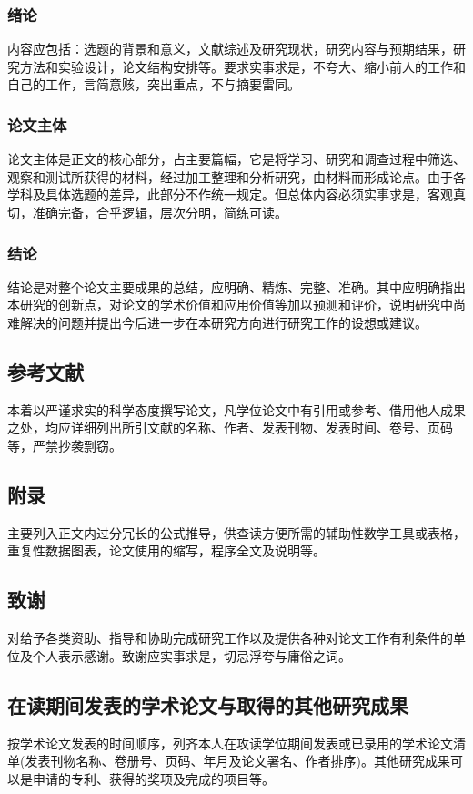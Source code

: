 \subsubsection{绪论}
内容应包括：选题的背景和意义，文献综述及研究现状，研究内容与预期结果，研究方法和实验设计，论文结构安排等。要求实事求是，不夸大、缩小前人的工作和自己的工作，言简意赅，突出重点，不与摘要雷同。
\subsubsection{论文主体}
论文主体是正文的核心部分，占主要篇幅，它是将学习、研究和调查过程中筛选、观察和测试所获得的材料，经过加工整理和分析研究，由材料而形成论点。由于各学科及具体选题的差异，此部分不作统一规定。但总体内容必须实事求是，客观真切，准确完备，合乎逻辑，层次分明，简练可读。
\subsubsection{结论}
结论是对整个论文主要成果的总结，应明确、精炼、完整、准确。其中应明确指出本研究的创新点，对论文的学术价值和应用价值等加以预测和评价，说明研究中尚难解决的问题并提出今后进一步在本研究方向进行研究工作的设想或建议。

\subsection{参考文献}
本着以严谨求实的科学态度撰写论文，凡学位论文中有引用或参考、借用他人成果之处，均应详细列出所引文献的名称、作者、发表刊物、发表时间、卷号、页码等，严禁抄袭剽窃。　　
\subsection{附录}
主要列入正文内过分冗长的公式推导，供查读方便所需的辅助性数学工具或表格，重复性数据图表，论文使用的缩写，程序全文及说明等。

\subsection{致谢}
对给予各类资助、指导和协助完成研究工作以及提供各种对论文工作有利条件的单位及个人表示感谢。致谢应实事求是，切忌浮夸与庸俗之词。

\subsection{在读期间发表的学术论文与取得的其他研究成果}
按学术论文发表的时间顺序，列齐本人在攻读学位期间发表或已录用的学术论文清单(发表刊物名称、卷册号、页码、年月及论文署名、作者排序)。其他研究成果可以是申请的专利、获得的奖项及完成的项目等。


